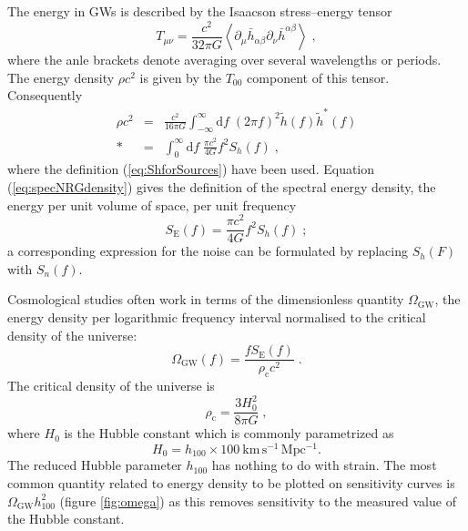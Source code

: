 The energy in GWs is described by the Isaacson stress--energy tensor \citep[section 35.15]{MTW}
\begin{equation}
T_{\mu\nu}=\frac{c^{2}}{32\pi G}\left<\partial_{\mu}\bar{h}_{\alpha\beta}\partial_{\nu}\bar{h}^{\alpha\beta}\right> \;,
\end{equation}
where the anle brackets denote averaging over several wavelengths or periods. The energy density $\rho c^{2}$ is given by the $T_{00}$ component of this tensor. Consequently
\begin{eqnarray}
\label{eq:specNRGdensity}
\rho c^{2} &=& \frac{c^{2}}{16\pi G}\int_{-\infty}^{\infty}\mathrm{d}f\;\left(2\pi f\right)^{2}\tilde{h}(f)\tilde{h}^{*}(f) \\*
 &=& \int_{0}^{\infty}\mathrm{d}f\;\frac{\pi c^{2}}{4G}f^{2}S_{h}(f)\; ,
\end{eqnarray} 
where the definition (\ref{eq:ShforSources}) have been used. Equation (\ref{eq:specNRGdensity}) gives the definition of the spectral energy density, the energy per unit volume of space, per unit frequency \citep{HellingsDowns}
\begin{equation}\label{eq:spectralenergydensity}
S_{\mathrm{E}}(f)=\frac{\pi c^{2}}{4G} f^{2}S_{h}(f) \; ;
\end{equation}
a corresponding expression for the noise can be formulated by replacing $S_h(F)$ with $S_{n}(f)$.

Cosmological studies often work in terms of the dimensionless quantity $\Omega_{\mathrm{GW}}$, the energy density per logarithmic frequency interval normalised to the critical density of the universe:
\begin{equation}
\label{eq:omega}
\Omega_\mathrm{GW}(f) = \frac{fS_{\mathrm{E}}(f)}{\rho_{\mathrm{c}}c^{2}} \; .
\end{equation}
The critical density of the universe is
\begin{equation}\label{eq:crit-density}
\rho_{\mathrm{c}}=\frac{3H_{0}^{2}}{8\pi G} \;,
\end{equation}
 where $H_{0}$ is the Hubble constant which is commonly parametrized as
\begin{equation}
H_0 =h_{100}\times 100~\mathrm{km\,s^{-1}\,Mpc^{-1}}.
\end{equation}
The reduced Hubble parameter $h_{100}$ has nothing to do with strain. The most common quantity related to energy density to be plotted on sensitivity curves is $\Omega_{\mathrm{GW}}h_{100}^{2}$ (figure \ref{fig:omega}) as this removes sensitivity to the measured value of the Hubble constant.

